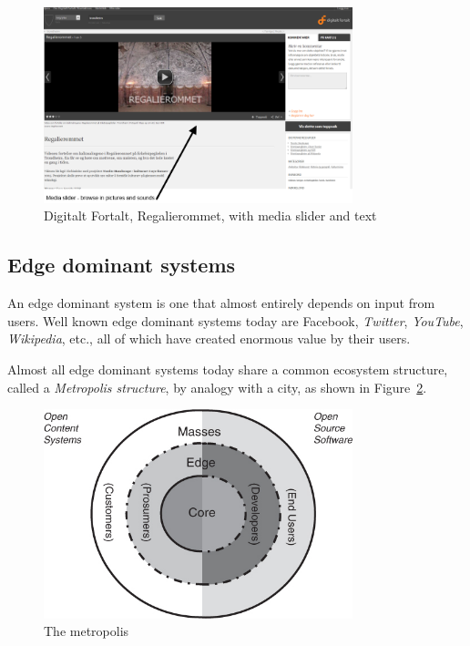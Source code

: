 \documentclass[11pt]{book}
\begin{document}
\begin{figure}[H]
      \centering
      \includegraphics[width=0.8\textwidth]{Figures/Prestudy/digitaltfortaltRegalierommet.png}
      \caption{Digitalt Fortalt, Regalierommet, with media slider and text}
      \label{fig:pre_fortaltRegalierommet}
\end{figure}

\subsection{Edge dominant systems}\label{subsec:edge}
An edge dominant system is one that almost entirely depends on input from users. Well known edge dominant systems today are Facebook, \emph{Twitter}, \emph{YouTube}, \emph{Wikipedia}, etc., all of which have created enormous value by their users. 

Almost all edge dominant systems today share a common ecosystem structure, called a \emph{Metropolis structure}, by analogy with a city, as shown in Figure~\ref{fig:pre_edgeMetropolis}.

\begin{figure}[H]
      \centering
      \includegraphics[width=0.8\textwidth]{Figures/Prestudy/metropolis.jpg}
      \caption{The metropolis}
      \label{fig:pre_edgeMetropolis}
\end{figure}
\end{document}
